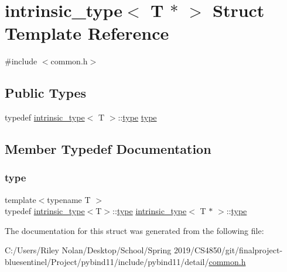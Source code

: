 \hypertarget{structintrinsic__type_3_01_t_01_5_01_4}{}\section{intrinsic\+\_\+type$<$ T $\ast$ $>$ Struct Template Reference}
\label{structintrinsic__type_3_01_t_01_5_01_4}


{\ttfamily \#include $<$common.\+h$>$}

\subsection*{Public Types}
\begin{DoxyCompactItemize}
\item 
typedef \mbox{\hyperlink{structintrinsic__type}{intrinsic\+\_\+type}}$<$ T $>$\+::\mbox{\hyperlink{structintrinsic__type_3_01_t_01_5_01_4_acbb73521557b43fd38e099972cf37a7e}{type}} \mbox{\hyperlink{structintrinsic__type_3_01_t_01_5_01_4_acbb73521557b43fd38e099972cf37a7e}{type}}
\end{DoxyCompactItemize}


\subsection{Member Typedef Documentation}
\mbox{\label{structintrinsic__type_3_01_t_01_5_01_4_acbb73521557b43fd38e099972cf37a7e}} 
\subsubsection{\texorpdfstring{type}{type}}
{\footnotesize\ttfamily template$<$typename T $>$ \\
typedef \mbox{\hyperlink{structintrinsic__type}{intrinsic\+\_\+type}}$<$T$>$\+::\mbox{\hyperlink{structintrinsic__type_3_01_t_01_5_01_4_acbb73521557b43fd38e099972cf37a7e}{type}} \mbox{\hyperlink{structintrinsic__type}{intrinsic\+\_\+type}}$<$ T $\ast$ $>$\+::\mbox{\hyperlink{structintrinsic__type_3_01_t_01_5_01_4_acbb73521557b43fd38e099972cf37a7e}{type}}}



The documentation for this struct was generated from the following file\+:\begin{DoxyCompactItemize}
\item 
C\+:/\+Users/\+Riley Nolan/\+Desktop/\+School/\+Spring 2019/\+C\+S4850/git/finalproject-\/bluesentinel/\+Project/pybind11/include/pybind11/detail/\mbox{\hyperlink{detail_2common_8h}{common.\+h}}\end{DoxyCompactItemize}
